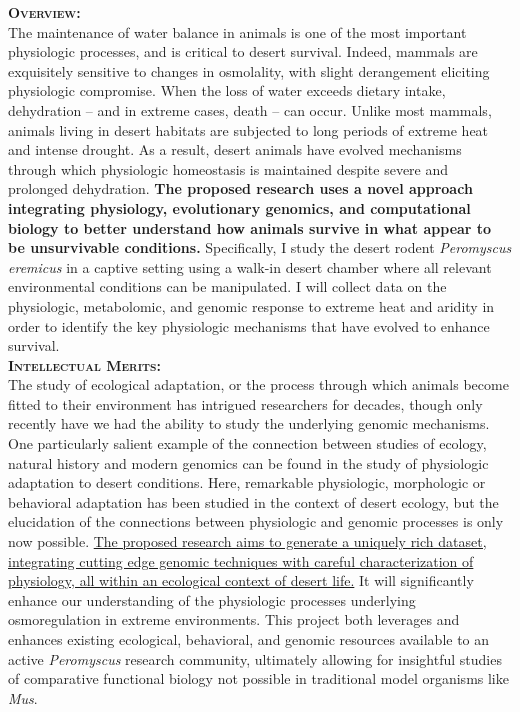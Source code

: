 \documentclass{article}
\begin{document}
\parindent 0.000000001in
\setcounter{page}{0}

\pagestyle{fancy}




\large{\textbf{\textsc{Overview:}}} \\
\normalsize 
The maintenance of water balance in animals is one of the most important physiologic processes, and is critical to desert survival. Indeed, mammals are exquisitely sensitive to changes in osmolality, with slight derangement eliciting physiologic compromise.  When the loss of water exceeds dietary intake, dehydration -- and in extreme cases, death -- can occur.  Unlike most mammals, animals living in desert habitats are subjected to long periods of extreme heat and intense drought.  As a result, desert animals have evolved mechanisms through which physiologic homeostasis is maintained despite severe and prolonged dehydration. \textbf{The proposed research uses a novel approach integrating physiology, evolutionary genomics, and computational biology to better understand how animals survive in what appear to be unsurvivable conditions.} Specifically, I study the desert rodent \textit{Peromyscus eremicus} in a captive setting using a walk-in desert chamber where all relevant environmental conditions can be manipulated. I will collect data on the physiologic, metabolomic, and genomic response to extreme heat and aridity in order to identify the key physiologic mechanisms that have evolved to enhance survival. \\

\large{\textbf{\textsc{Intellectual Merits:}}} \\
\normalsize
The study of ecological adaptation, or the process through which animals become fitted to their environment has intrigued researchers for decades, though only recently have we had the ability to study the underlying genomic mechanisms. One particularly salient example of the connection between studies of ecology, natural history and modern genomics can be found in the study of physiologic adaptation to desert conditions. Here, remarkable physiologic, morphologic or behavioral adaptation has been studied in the context of desert ecology, but the elucidation of the connections between physiologic and genomic processes is only now possible. \ul{The proposed research aims to generate a uniquely rich dataset, integrating cutting edge genomic techniques with careful characterization of physiology, all within an ecological context of desert life.}  It will significantly enhance our understanding of the physiologic processes underlying osmoregulation in extreme environments. This project both leverages and enhances existing ecological, behavioral, and genomic resources available to an active \textit{Peromyscus} research community, ultimately allowing for insightful studies of comparative functional biology not possible in traditional model organisms like \textit{Mus}.\\
\end{document}
